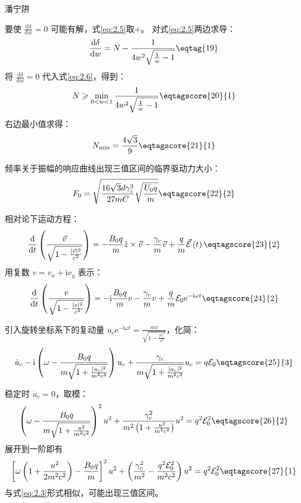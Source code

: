 \documentclass[answer]{cphos}
\begin{document}
\begin{problem}[40]{潘宁阱}
\begin{solution}
\begin{equation}
\end{equation}
要使 $\frac{\mathrm{d}\delta}{\mathrm{d}w}=0$ 可能有解，式\ref{eq:2.5}取$+$。
对式\ref{eq:2.5}两边求导：
\begin{equation}
	\frac{\mathrm{d}\delta}{\mathrm{d}w}=N-\frac{1}{4w^2\sqrt{\frac{1}{w}-1}}\eqtag{19}\label{eq:2.6}
\end{equation}
将 $\frac{\mathrm{d}\delta}{\mathrm{d}w}=0$ 代入式\ref{eq:2.6}，得到：
\begin{equation}
	N\geqslant\min\limits_{0<w<1}\frac{1}{4w^2\sqrt{\frac{1}{w}-1}}\eqtagscore{20}{1}
\end{equation}
右边最小值求得：
\begin{equation}
	N_{\min}=\frac{4\sqrt{3}}{9}\eqtagscore{21}{1}
\end{equation}

频率关于振幅的响应曲线出现三值区间的临界驱动力大小：
\begin{equation}
	F_0=\sqrt{\frac{16\sqrt{3}d\gamma_z^3}{27mC}\sqrt{\frac{U_0 q}{m}}}\eqtagscore{22}{2}
\end{equation}

相对论下运动方程：
\begin{equation}
	\frac{\mathrm{d}}{\mathrm{d}t}\left( \frac{\vec{v}}{\sqrt{1-\frac{|\vec{v}|^2}{c^2}}} \right) = -\frac{B_0 q}{m} \hat{z}\times\vec{v} - \frac{\gamma_c}{m} \vec{v} + \frac{q}{m}\vec{{\mathcal{E}}}\left(t\right)\eqtagscore{23}{2}
\end{equation}
用复数 $v=v_x+\mathrm{i}v_y$ 表示：
\begin{equation}
	\frac{\mathrm{d}}{\mathrm{d}t}\left( \frac{v}{\sqrt{1-\frac{|v|^2}{c^2}}} \right) =-\mathrm{i} \frac{B_0 q}{m} v - \frac{\gamma_c}{m} v + \frac{q}{m}\mathcal{E}_0 \mathrm{e}^{-\mathrm{i}\omega t}\eqtagscore{24}{2}
\end{equation}

引入旋转坐标系下的复动量 $u_c \mathrm{e}^{-\mathrm{i}\omega t} = \frac{mv}{\sqrt{1-\frac{|v|^2}{c^2}}}$，化简：
\begin{equation}
	\dot{u}_c - \mathrm{i}\left(\omega - \frac{B_0 q}{m\sqrt{1+\frac{|u_c|^2}{m^2c^2}}}\right) u_c + \frac{\gamma_c}{m\sqrt{1+\frac{|u_c|^2}{m^2c^2}}} u_c = q\mathcal{E}_0\eqtagscore{25}{3}
\end{equation}

稳定时 $\dot{u}_c=0$，取模：
\begin{equation}
	\left(\omega - \frac{B_0 q}{m\sqrt{1+\frac{u^2}{m^2c^2}}}\right) ^2 u^2 + \frac{\gamma_c ^2}{m^2\left(1+\frac{u^2}{m^2c^2}\right)} u^2 = q^2 \mathcal{E}_0 ^2\eqtagscore{26}{2}
\end{equation}
展开到一阶即有
\begin{equation}
	\left[\omega\left(1+\frac{u^2}{2m^2c^2}\right) - \frac{B_0 q}{m}\right] ^2 u^2 + \left(\frac{\gamma_c ^2}{m^2}-\frac{q^2\mathcal{E}_0^2}{m^2c^2}\right) u^2 = q^2 \mathcal{E}_0 ^2\eqtagscore{27}{1}
\end{equation}
与式\ref{eq:2.3}形式相似，可能出现三值区间。


\end{solution}
\end{problem}
\end{document}
